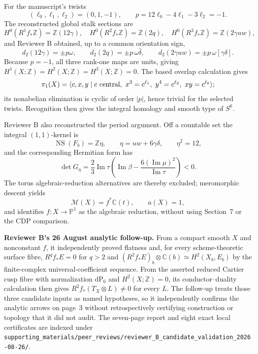{\ResultSmall
For the manuscript's twists
\[
 (\ell_0,\ell_1,\ell_2)=(0,1,-1),\qquad
 p=12\ell_0-4\ell_1-3\ell_2=-1.
\]
The reconstructed global stalk sections are
\[
 H^0(R^1f_*\mathbb Z)=\mathbb Z(12\gamma),\quad
 H^0(R^2f_*\mathbb Z)=\mathbb Z(2q),\quad
 H^0(R^3f_*\mathbb Z)=\mathbb Z(2\gamma uw),
\]
and Reviewer B obtained, up to a common orientation sign,
\[
 d_2(12\gamma)=\pm p\omega,\qquad
 d_2(2q)=\pm p\,\omega\bar\delta,\qquad
 d_2(2\gamma uw)=\pm p\,\omega[\gamma\delta].
\]
Because $p=-1$, all three rank-one maps are units, giving
\(H^1(X;\mathbb Z)=H^2(X;\mathbb Z)=H^3(X;\mathbb Z)=0\).  The based
overlap calculation gives
\[
 \pi_1(X)=\langle c,x,y\mid c\ {\rm central},\
 x^3=c^{\ell_1},\ y^4=c^{\ell_2},\ xy=c^{\ell_0}\rangle;
\]
its nonabelian elimination is cyclic of order $|p|$, hence trivial for
the selected twists.  Recognition then gives the integral homology and
smooth type of $S^6$.
}

{\ResultSmall
Reviewer B also reconstructed the period argument.  Off a countable set the
integral $(1,1)$-kernel is
\[
 \operatorname{NS}(F_b)=\mathbb Z\eta,\qquad
 \eta=uw+6\gamma\delta,\qquad \eta^2=12,
\]
and the corresponding Hermitian form has
\[
 \det G_\eta=\frac23\operatorname{Im}\tau
 \left(\operatorname{Im}\beta-
 \frac{6(\operatorname{Im}\mu)^2}{\operatorname{Im}\tau}\right)<0.
\]
The torus algebraic-reduction alternatives are thereby excluded; meromorphic
descent yields
\[
 \mathcal M(X)=f^*\mathbb C(t),\qquad a(X)=1,
\]
and identifies $f:X\to\mathbb P^1$ as the algebraic reduction, without
using Section~7 or the CDP comparison.
}

\vfill
{\fontsize{6.45pt}{7.38pt}\selectfont\color{AuditProvenance}
\textbf{Reviewer B's 26 August analytic follow-up.}  From a compact smooth
$X$ and nonconstant $f$, it independently proved flatness and, for every
scheme-theoretic surface fibre, $R^qf_*E=0$ for $q>2$ and
$(R^2f_*E)_b\otimes\mathbb C(b)\simeq H^2(X_b,E_b)$ by the finite-complex
universal-coefficient sequence.  From the asserted reduced Cartier cusp
fibre with normalization $\mathrm{dP}_6$ and $H^2(X;\mathbb Z)=0$, its
conductor--duality calculation then gives
$R^2f_*(T_X\otimes L)\ne0$ for every $L$.  The follow-up treats those three
candidate inputs as named hypotheses, so it independently confirms the
analytic arrows on page~3 without retrospectively certifying construction or
topology that it did not audit.  The seven-page report and eight exact local
certificates are indexed under
\nolinkurl{supporting_materials/peer_reviews/reviewer_B_candidate_validation_2026-08-26/}.}
\endgroup


